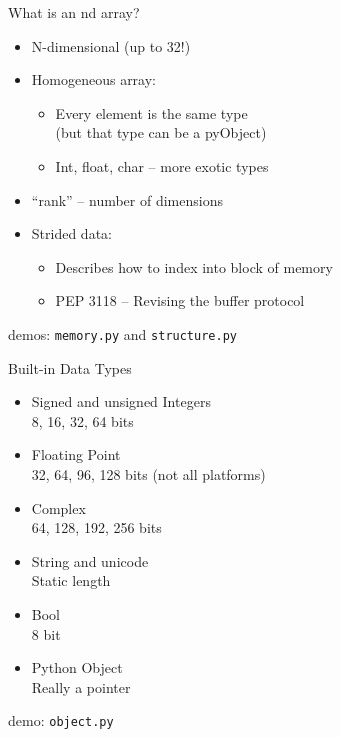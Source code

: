 \documentclass{beamer}
\begin{document}
\begin{frame}[fragile]{What is an nd array?}
\begin{itemize}
  \item N-dimensional (up to 32!)
  \item Homogeneous array:
  \begin{itemize}
    \item Every element is the same type\\
          (but that type can be a pyObject)
    \item Int, float, char -- more exotic types
  \end{itemize}
  \item ``rank'' – number of dimensions
  \item Strided data:
  \begin{itemize}
    \item Describes how to index into block of memory
    \item PEP 3118 -- Revising the buffer protocol
  \end{itemize}
\end{itemize}

\vfill
{\large demos: \verb|memory.py| and \verb|structure.py|}

\end{frame} 

\begin{frame}[fragile]{Built-in Data Types}

\begin{itemize}
  \item Signed and unsigned Integers\\
        8, 16, 32, 64 bits
  \item Floating Point\\
        32, 64, 96, 128 bits (not all platforms)
  \item Complex\\
        64, 128, 192, 256 bits
  \item String and unicode\\
        Static length 
  \item Bool \\
        8 bit
  \item Python Object \\
        Really a pointer
\end{itemize}

\vfill
{\large demo: \verb|object.py|}

\end{frame} 
\end{document}
